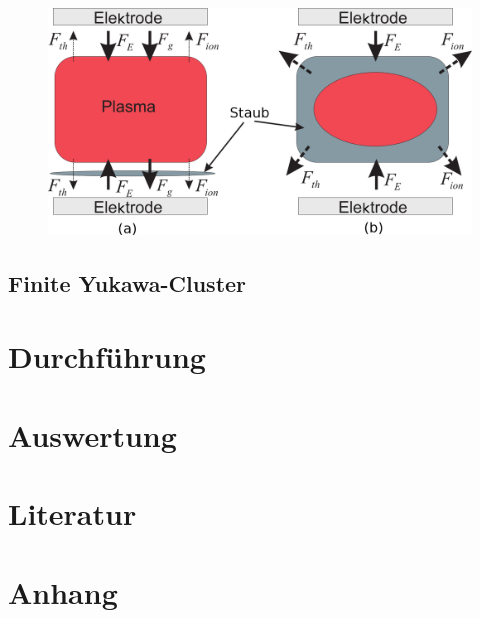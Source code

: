 \documentclass[numbers=noenddot,a4paper]{scrartcl}
\begin{document}
					\begin{figure}
						\centering
						\includegraphics[width=\textwidth,height=0.5\textwidth]{figs/directionsofforcesandtrappingmelzer.png}
					\end{figure}
					
				
		\subsection{Finite Yukawa-Cluster}\label{sec:yukawaclust}
					
	\newpage
	
	\section{Durchführung}\label{sec:durch}
	
	\newpage
	
	\section{Auswertung}\label{sec:auswert}
	
	\newpage
	
	\section{Literatur}\label{sec:lit}
	
		
		
	
	\newpage
	
	\section{Anhang}\label{sec:anhang}
	
%		
%				
	
\end{document}
